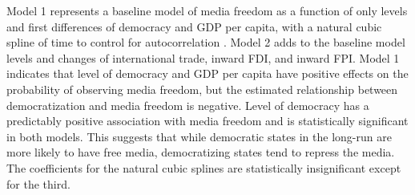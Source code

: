\documentclass[12pt,a4paper]{article}\usepackage[]{graphicx}\usepackage[]{color}
\begin{document}
Model 1 represents a baseline model of media freedom as a function of only levels and first differences of democracy and GDP per capita, with a natural cubic spline of time to control for autocorrelation \parencite{Beck:1998wg}. Model 2 adds to the baseline model levels and changes of international trade, inward FDI, and inward FPI. Model 1 indicates that level of democracy and GDP per capita have positive effects on the probability of observing media freedom, but the estimated relationship between democratization and media freedom is negative. Level of democracy has a predictably positive association with media freedom and is statistically significant in both models. This suggests that while democratic states in the long-run are more likely to have free media, democratizing states tend to repress the media. The coefficients for the natural cubic splines are statistically insignificant except for the third.
\end{document}
